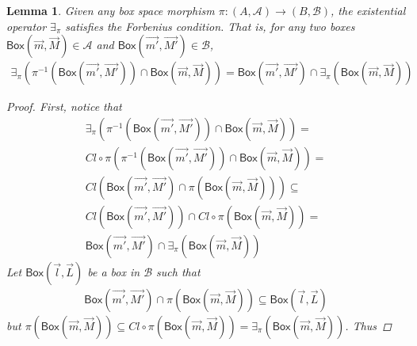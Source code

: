 \documentclass[12pt]{article}
\newtheorem{lemma}[theorem]{Lemma}
\newcommand{\bobject}{\mathsf{Box}}
\begin{document}
\begin{lemma}
    Given any
    box space morphism $\pi:(A,\mathcal{A})\to(B,\mathcal{B})$,
    the existential operator $\exists_\pi$ satisfies the Forbenius condition.
    That is, for any two boxes $\bobject(\vec{m},\vec{M})\in\mathcal{A}$ and $\bobject(\vec{m'},\vec{M'})\in\mathcal{B}$,
    \begin{gather*}
        \exists_\pi(\pi^{-1}(\bobject(\vec{m'},\vec{M'})) \cap \bobject(\vec{m},\vec{M})) = \bobject(\vec{m'},\vec{M'}) \cap \exists_\pi(\bobject(\vec{m},\vec{M}))
    \end{gather*}
    \begin{proof}
        First,
        notice that
        \begin{gather*}
            \exists_\pi(\pi^{-1}(\bobject(\vec{m'},\vec{M'})) \cap \bobject(\vec{m},\vec{M}))=
            \\
            Cl\circ\pi(\pi^{-1}(\bobject(\vec{m'},\vec{M'})) \cap \bobject(\vec{m},\vec{M}))=
            \\
            Cl(\bobject(\vec{m'},\vec{M'})\cap \pi( \bobject(\vec{m},\vec{M})))\subseteq
            \\
            Cl(\bobject(\vec{m'},\vec{M'}))\cap Cl\circ\pi(\bobject(\vec{m},\vec{M}))=
            \\
            \bobject(\vec{m'},\vec{M'})\cap \exists_\pi(\bobject(\vec{m},\vec{M}))
        \end{gather*}
        Let $\bobject(\vec{l},\vec{L})$ be a box in $\mathcal{B}$ such that
        \begin{gather*}
            \bobject(\vec{m'},\vec{M'})\cap \pi( \bobject(\vec{m},\vec{M}))\subseteq
            \bobject(\vec{l},\vec{L})
        \end{gather*}
        but $\pi(\bobject(\vec{m},\vec{M}))\subseteq Cl\circ \pi(\bobject(\vec{m},\vec{M}))=\exists_\pi(\bobject(\vec{m},\vec{M}))$. Thus

    \end{proof}
\end{lemma}
\end{document}
